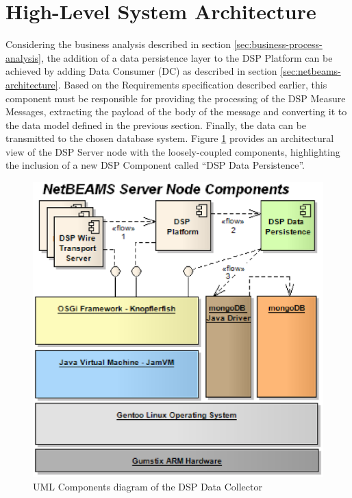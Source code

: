 \section{High-Level System Architecture}

Considering the business analysis described in section
\ref{sec:business-process-analysis}, the addition of a data persistence layer
to the DSP Platform can be achieved by adding Data Consumer (DC) as described
in section \ref{sec:netbeams-architecture}. Based on the Requirements
specification described earlier, this component must be responsible for
providing the processing of the DSP Measure Messages, extracting the payload of
the body of the message and converting it to the data model defined in the
previous section. Finally, the data can be transmitted to the chosen database
system. Figure \ref{fig:NetBEAMS-Persistence-Server-Node-Components} provides
an architectural view of the DSP Server node with the loosely-coupled
components, highlighting the inclusion of a new DSP Component called ``DSP Data
Persistence''.

\begin{figure}[!b]
  \centering
  \includegraphics[scale=0.5]{../diagrams/NetBEAMS-Persistence-Server-Node-Components}
  \caption{UML Components diagram of the DSP Data Collector}
  \label{fig:NetBEAMS-Persistence-Server-Node-Components}
\end{figure}

